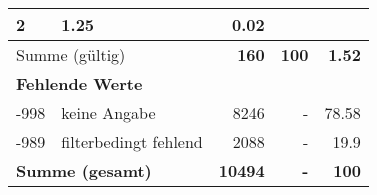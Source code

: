 \begin{longtable}{lXrrr}
       \num{2} &
       \num[round-mode=places,round-precision=2]{1.25} &
         \num[round-mode=places,round-precision=2]{0.02} \\
     \midrule
     \multicolumn{2}{l}{Summe (gültig)} &
       \textbf{\num{160}} &
     \textbf{\num{100}} &
       \textbf{\num[round-mode=places,round-precision=2]{1.52}} \\
     \multicolumn{5}{l}{\textbf{Fehlende Werte}}\\
       -998 &
       keine Angabe &
         \num{8246} &
        - &
         \num[round-mode=places,round-precision=2]{78.58} \\
       -989 &
       filterbedingt fehlend &
         \num{2088} &
        - &
         \num[round-mode=places,round-precision=2]{19.9} \\
     \midrule
     \multicolumn{2}{l}{\textbf{Summe (gesamt)}} &
          \textbf{\num{10494}} &
        \textbf{-} &
        \textbf{\num{100}} \\
     \bottomrule
     \end{longtable}
     
